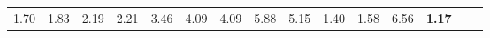 \begin{tabular}{ll|rrrrrrrrr|rrrr}
  


  
  1.70 & 1.83 & 2.19 & 2.21 & 3.46 & 4.09 & 4.09 & 5.88 & 5.15 & 1.40 & 1.58 & 6.56 & \textbf{1.17} \\


\end{tabular}
